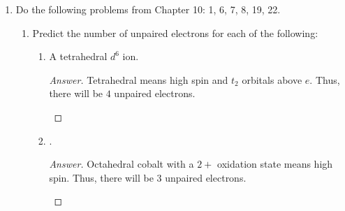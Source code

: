 \documentclass[../psets.tex]{subfiles}
\begin{document}
\begin{enumerate}[label={\Roman*)}]
\begin{enumerate}
\begin{proof}[Answer]
\begin{center}
            \end{center}
        \end{proof}
    \end{enumerate}
    \newpage
    \item Do the following problems from Chapter 10: 1, 6, 7, 8, 19, 22.
    \begin{enumerate}[label={\textbf{10.\arabic*}}]
        \item Predict the number of unpaired electrons for each of the following:
        \begin{enumerate}[label={\textbf{\alph*.}}]
            \item A tetrahedral $d^6$ ion.
            \begin{proof}[Answer]
                Tetrahedral means high spin and $t_2$ orbitals above $e$. Thus, there will be $\boxed{4}$ unpaired electrons.
                \begin{center}
                \end{center}
            \end{proof}
            \item {}.
            \begin{proof}[Answer]
                Octahedral cobalt with a $2+$ oxidation state means high spin. Thus, there will be $\boxed{3}$ unpaired electrons.
                \begin{center}
\end{center}
\end{proof}
\end{enumerate}
\end{enumerate}
\end{enumerate}
\end{document}
